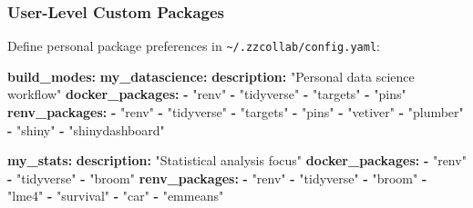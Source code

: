\documentclass[
]{article}
\newenvironment{Shaded}{\begin{snugshade}}{\end{snugshade}}
\newcommand{\AttributeTok}[1]{\textcolor[rgb]{0.13,0.29,0.53}{#1}}
\newcommand{\FunctionTok}[1]{\textcolor[rgb]{0.13,0.29,0.53}{\textbf{#1}}}
\newcommand{\KeywordTok}[1]{\textcolor[rgb]{0.13,0.29,0.53}{\textbf{#1}}}
\newcommand{\StringTok}[1]{\textcolor[rgb]{0.31,0.60,0.02}{#1}}
\begin{document}
\subsubsection{User-Level Custom
Packages}\label{user-level-custom-packages}

Define personal package preferences in
\texttt{\textasciitilde{}/.zzcollab/config.yaml}:

\begin{Shaded}
\begin{Highlighting}[]
\FunctionTok{build\_modes}\KeywordTok{:}
\AttributeTok{  }\FunctionTok{my\_datascience}\KeywordTok{:}
\AttributeTok{    }\FunctionTok{description}\KeywordTok{:}\AttributeTok{ }\StringTok{"Personal data science workflow"}
\AttributeTok{    }\FunctionTok{docker\_packages}\KeywordTok{:}
\AttributeTok{      }\KeywordTok{{-}}\AttributeTok{ }\StringTok{"renv"}
\AttributeTok{      }\KeywordTok{{-}}\AttributeTok{ }\StringTok{"tidyverse"}
\AttributeTok{      }\KeywordTok{{-}}\AttributeTok{ }\StringTok{"targets"}
\AttributeTok{      }\KeywordTok{{-}}\AttributeTok{ }\StringTok{"pins"}
\AttributeTok{    }\FunctionTok{renv\_packages}\KeywordTok{:}
\AttributeTok{      }\KeywordTok{{-}}\AttributeTok{ }\StringTok{"renv"}
\AttributeTok{      }\KeywordTok{{-}}\AttributeTok{ }\StringTok{"tidyverse"}
\AttributeTok{      }\KeywordTok{{-}}\AttributeTok{ }\StringTok{"targets"}
\AttributeTok{      }\KeywordTok{{-}}\AttributeTok{ }\StringTok{"pins"}
\AttributeTok{      }\KeywordTok{{-}}\AttributeTok{ }\StringTok{"vetiver"}
\AttributeTok{      }\KeywordTok{{-}}\AttributeTok{ }\StringTok{"plumber"}
\AttributeTok{      }\KeywordTok{{-}}\AttributeTok{ }\StringTok{"shiny"}
\AttributeTok{      }\KeywordTok{{-}}\AttributeTok{ }\StringTok{"shinydashboard"}

\AttributeTok{  }\FunctionTok{my\_stats}\KeywordTok{:}
\AttributeTok{    }\FunctionTok{description}\KeywordTok{:}\AttributeTok{ }\StringTok{"Statistical analysis focus"}
\AttributeTok{    }\FunctionTok{docker\_packages}\KeywordTok{:}
\AttributeTok{      }\KeywordTok{{-}}\AttributeTok{ }\StringTok{"renv"}
\AttributeTok{      }\KeywordTok{{-}}\AttributeTok{ }\StringTok{"tidyverse"}
\AttributeTok{      }\KeywordTok{{-}}\AttributeTok{ }\StringTok{"broom"}
\AttributeTok{    }\FunctionTok{renv\_packages}\KeywordTok{:}
\AttributeTok{      }\KeywordTok{{-}}\AttributeTok{ }\StringTok{"renv"}
\AttributeTok{      }\KeywordTok{{-}}\AttributeTok{ }\StringTok{"tidyverse"}
\AttributeTok{      }\KeywordTok{{-}}\AttributeTok{ }\StringTok{"broom"}
\AttributeTok{      }\KeywordTok{{-}}\AttributeTok{ }\StringTok{"lme4"}
\AttributeTok{      }\KeywordTok{{-}}\AttributeTok{ }\StringTok{"survival"}
\AttributeTok{      }\KeywordTok{{-}}\AttributeTok{ }\StringTok{"car"}
\AttributeTok{      }\KeywordTok{{-}}\AttributeTok{ }\StringTok{"emmeans"}
\end{Highlighting}
\end{Shaded}
\end{document}
